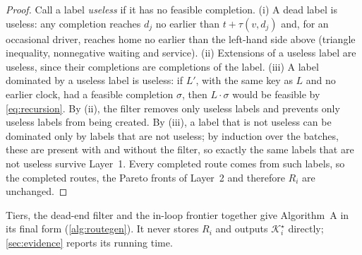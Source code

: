\documentclass[11pt]{article}
\theoremstyle{definition}
\theoremstyle{remark}
\newcommand{\Ks}{\mathcal{K}^{\star}}
\begin{document}
\begin{proof}
Call a label \emph{useless} if it has no feasible completion. (i) A dead label is
useless: any completion reaches $d_j$ no earlier than $t+\tau(v,d_j)$ and, for an
occasional driver, reaches home no earlier than the left-hand side above
(triangle inequality, nonnegative waiting and service). (ii) Extensions of a
useless label are useless, since their completions are completions of the
label. (iii) A label dominated by a useless label is useless: if $L'$, with the same
key as $L$ and no earlier clock, had a feasible completion $\sigma$, then
$L\cdot\sigma$ would be feasible by \eqref{eq:recursion}. By (ii), the filter
removes only useless labels and prevents only useless labels from being created.
By (iii), a label that is not useless can be dominated only by labels that are
not useless; by induction over the batches, these are present with and without
the filter, so exactly the same labels that are not useless survive Layer~1.
Every completed route comes from such labels, so the completed routes, the
Pareto fronts of Layer~2 and therefore $R_i$ are unchanged.
\end{proof}

Tiers, the dead-end filter and the in-loop frontier together give Algorithm~A in
its final form (\cref{alg:routegen}). It never stores $R_i$ and outputs $\Ks_i$
directly; \cref{sec:evidence} reports its running time.
\end{document}
